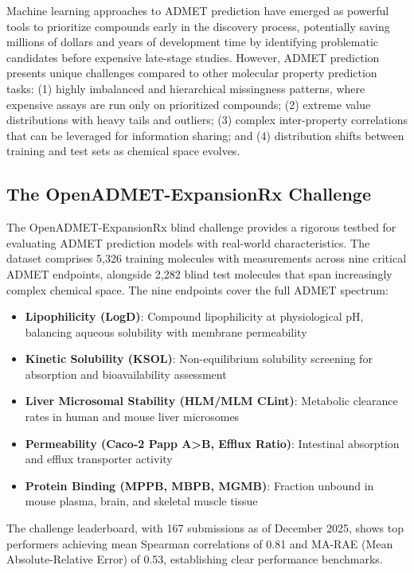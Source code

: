 \documentclass[11pt,a4paper]{article}
\begin{document}
Machine learning approaches to ADMET prediction have emerged as powerful tools to prioritize compounds early in the discovery process, potentially saving millions of dollars and years of development time by identifying problematic candidates before expensive late-stage studies\cite{Macdern2025ASAP}. However, ADMET prediction presents unique challenges compared to other molecular property prediction tasks: (1) highly imbalanced and hierarchical missingness patterns, where expensive assays are run only on prioritized compounds; (2) extreme value distributions with heavy tails and outliers; (3) complex inter-property correlations that can be leveraged for information sharing; and (4) distribution shifts between training and test sets as chemical space evolves\cite{kosmos_discovery1}.

\subsection{The OpenADMET-ExpansionRx Challenge}

The OpenADMET-ExpansionRx blind challenge provides a rigorous testbed for evaluating ADMET prediction models with real-world characteristics\cite{expansion_about}. The dataset comprises 5,326 training molecules with measurements across nine critical ADMET endpoints, alongside 2,282 blind test molecules that span increasingly complex chemical space. The nine endpoints cover the full ADMET spectrum:

\begin{itemize}
    \item \textbf{Lipophilicity (LogD)}: Compound lipophilicity at physiological pH, balancing aqueous solubility with membrane permeability
    \item \textbf{Kinetic Solubility (KSOL)}: Non-equilibrium solubility screening for absorption and bioavailability assessment
    \item \textbf{Liver Microsomal Stability (HLM/MLM CLint)}: Metabolic clearance rates in human and mouse liver microsomes
    \item \textbf{Permeability (Caco-2 Papp A>B, Efflux Ratio)}: Intestinal absorption and efflux transporter activity
    \item \textbf{Protein Binding (MPPB, MBPB, MGMB)}: Fraction unbound in mouse plasma, brain, and skeletal muscle tissue
\end{itemize}

The challenge leaderboard, with 167 submissions as of December 2025, shows top performers achieving mean Spearman correlations of 0.81 and MA-RAE (Mean Absolute-Relative Error) of 0.53, establishing clear performance benchmarks\cite{leaderboard}.
\end{document}
